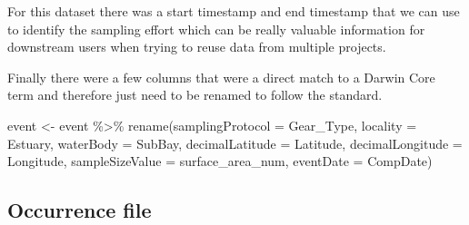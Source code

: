 \documentclass[
]{book}
\newenvironment{Shaded}{\begin{snugshade}}{\end{snugshade}}
\newcommand{\AttributeTok}[1]{\textcolor[rgb]{0.77,0.63,0.00}{#1}}
\newcommand{\ControlFlowTok}[1]{\textcolor[rgb]{0.13,0.29,0.53}{\textbf{#1}}}
\newcommand{\DecValTok}[1]{\textcolor[rgb]{0.00,0.00,0.81}{#1}}
\newcommand{\DocumentationTok}[1]{\textcolor[rgb]{0.56,0.35,0.01}{\textbf{\textit{#1}}}}
\newcommand{\FunctionTok}[1]{\textcolor[rgb]{0.00,0.00,0.00}{#1}}
\newcommand{\NormalTok}[1]{#1}
\newcommand{\OtherTok}[1]{\textcolor[rgb]{0.56,0.35,0.01}{#1}}
\newcommand{\SpecialCharTok}[1]{\textcolor[rgb]{0.00,0.00,0.00}{#1}}
\newcommand{\StringTok}[1]{\textcolor[rgb]{0.31,0.60,0.02}{#1}}
\begin{document}
For this dataset there was a start timestamp and end timestamp that we can use to identify the sampling effort which can be really valuable information for downstream users when trying to reuse data from multiple projects.

\begin{Shaded}
\end{Shaded}

Finally there were a few columns that were a direct match to a Darwin Core term and therefore just need to be renamed to follow the standard.

\begin{Shaded}
\begin{Highlighting}[]
\NormalTok{event }\OtherTok{\textless{}{-}}\NormalTok{ event }\SpecialCharTok{\%\textgreater{}\%}
  \FunctionTok{rename}\NormalTok{(}\AttributeTok{samplingProtocol =}\NormalTok{ Gear\_Type,}
         \AttributeTok{locality =}\NormalTok{ Estuary,}
         \AttributeTok{waterBody =}\NormalTok{ SubBay,}
         \AttributeTok{decimalLatitude =}\NormalTok{ Latitude,}
         \AttributeTok{decimalLongitude =}\NormalTok{ Longitude,}
         \AttributeTok{sampleSizeValue =}\NormalTok{ surface\_area\_num,}
         \AttributeTok{eventDate =}\NormalTok{ CompDate)}
\end{Highlighting}
\end{Shaded}

\hypertarget{occurrence-file}{%
\subsection{Occurrence file}\label{occurrence-file}}
\end{document}
